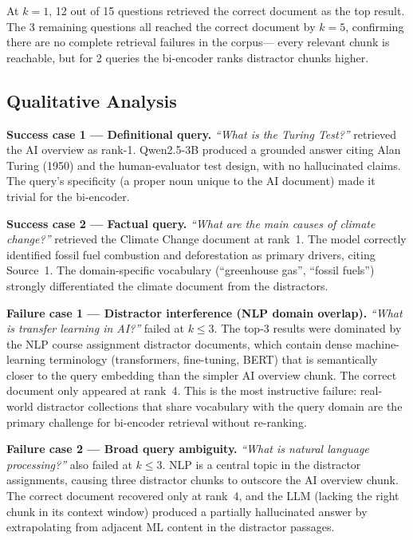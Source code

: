 \documentclass[10pt]{article}
\begin{document}
At $k{=}1$, 12 out of 15 questions retrieved the correct document as the
top result. The 3 remaining questions all reached the correct document by
$k{=}5$, confirming there are no complete retrieval failures in the corpus---
every relevant chunk is reachable, but for 2 queries the bi-encoder ranks
distractor chunks higher.

\subsection{Qualitative Analysis}

\textbf{Success case 1 — Definitional query.}
\textit{``What is the Turing Test?''} retrieved the AI overview as rank-1.
Qwen2.5-3B produced a grounded answer citing Alan Turing (1950) and the
human-evaluator test design, with no hallucinated claims.
The query's specificity (a proper noun unique to the AI document) made it
trivial for the bi-encoder.

\textbf{Success case 2 — Factual query.}
\textit{``What are the main causes of climate change?''} retrieved the
Climate Change document at rank~1.
The model correctly identified fossil fuel combustion and deforestation
as primary drivers, citing Source~1.
The domain-specific vocabulary (``greenhouse gas'', ``fossil fuels'') strongly
differentiated the climate document from the distractors.

\textbf{Failure case 1 — Distractor interference (NLP domain overlap).}
\textit{``What is transfer learning in AI?''} failed at $k{\leq}3$.
The top-3 results were dominated by the NLP course assignment distractor
documents, which contain dense machine-learning terminology
(transformers, fine-tuning, BERT) that is semantically closer to the query
embedding than the simpler AI overview chunk.
The correct document only appeared at rank~4.
This is the most instructive failure: real-world distractor collections
that share vocabulary with the query domain are the primary challenge for
bi-encoder retrieval without re-ranking.

\textbf{Failure case 2 — Broad query ambiguity.}
\textit{``What is natural language processing?''} also failed at $k{\leq}3$.
NLP is a central topic in the distractor assignments, causing three
distractor chunks to outscore the AI overview chunk.
The correct document recovered only at rank~4, and the LLM (lacking
the right chunk in its context window) produced a partially hallucinated
answer by extrapolating from adjacent ML content in the distractor passages.
\end{document}
